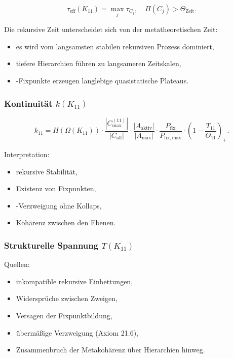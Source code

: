 \[
\tau_{\mathrm{eff}}(K_{11})
=
\max_j \tau_{C_j},
\quad
\Pi(C_j)>\Theta_{\mathrm{Zeit}}.
\]

Die rekursive Zeit unterscheidet sich von der metatheoretischen Zeit:
\begin{itemize}
    \item es wird vom langsamsten stabilen rekursiven Prozess dominiert,
    \item tiefere Hierarchien führen zu langsameren Zeitskalen,
    \item-Fixpunkte erzeugen langlebige quasistatische Plateaus.
\end{itemize}

\subsubsection{Kontinuität $k(K_{11})$}

\[
k_{11}=
H(\Omega(K_{11}))
\cdot
\frac{|C_{\max}^{(11)}|}{|C_{\mathrm{all}}|}
\cdot
\frac{|A_{\mathrm{aktiv}}|}{|A_{\max}|}
\cdot
\frac{P_{\mathrm{fix}}}{P_{\mathrm{fix,max}}}
\cdot
\left(1-\frac{T_{11}}{\Theta_{11}}\right)_+.
\]

Interpretation:
\begin{itemize}
    \item rekursive Stabilität,
    \item Existenz von Fixpunkten,
    \item-Verzweigung ohne Kollaps,
    \item Kohärenz zwischen den Ebenen.
\end{itemize}

\subsubsection{Strukturelle Spannung $T(K_{11})$}

Quellen:
\begin{itemize}
    \item inkompatible rekursive Einbettungen,
    \item Widersprüche zwischen Zweigen,
    \item Versagen der Fixpunktbildung,
    \item übermäßige Verzweigung (Axiom 21.6),
    \item Zusammenbruch der Metakohärenz über Hierarchien hinweg.
\end{itemize}

